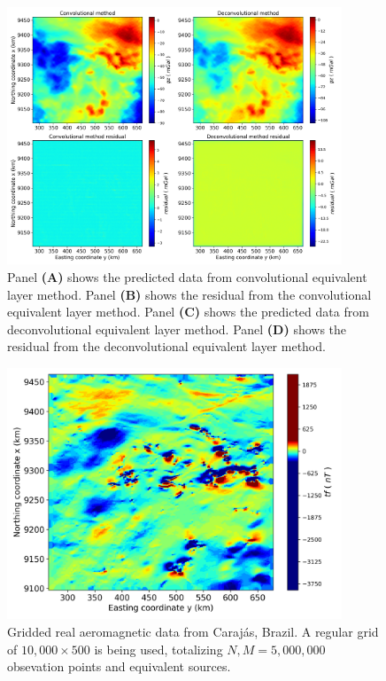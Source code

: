 \begin{figure}[htbp]
	\begin{center}
		\includegraphics[width=10cm]{Fig/carajas_gz_predito_1000x500}
	\end{center}
	\caption{Panel \textbf{(A)} shows the predicted data from convolutional equivalent layer method. Panel \textbf{(B)} shows the residual from the convolutional equivalent layer method. Panel \textbf{(C)} shows the predicted data from deconvolutional equivalent layer method. Panel \textbf{(D)} shows the residual from the deconvolutional equivalent layer method.}
	\label{fig:10}
\end{figure}

\begin{figure}[htbp]
	\begin{center}
		\includegraphics[width=10cm]{Fig/carajas_tf_real_data_1000x500}
	\end{center}
	\caption{Gridded real aeromagnetic data from Carajás, Brazil. A regular grid of $10,000 \times 500$ is being used, totalizing $N,M = 5, 000, 000$ obsevation points and equivalent sources.}
	\label{fig11}
\end{figure}

